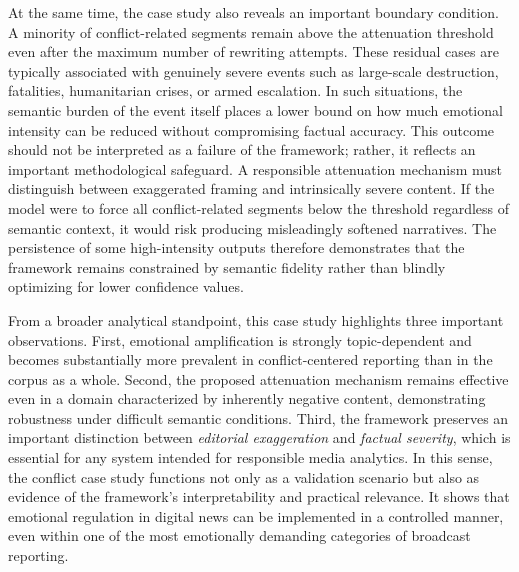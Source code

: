 \documentclass[final,1p,times]{elsarticle}
\begin{document}
At the same time, the case study also reveals an important boundary condition. A minority of conflict-related segments remain above the attenuation threshold even after the maximum number of rewriting attempts. These residual cases are typically associated with genuinely severe events such as large-scale destruction, fatalities, humanitarian crises, or armed escalation. In such situations, the semantic burden of the event itself places a lower bound on how much emotional intensity can be reduced without compromising factual accuracy. This outcome should not be interpreted as a failure of the framework; rather, it reflects an important methodological safeguard. A responsible attenuation mechanism must distinguish between exaggerated framing and intrinsically severe content. If the model were to force all conflict-related segments below the threshold regardless of semantic context, it would risk producing misleadingly softened narratives. The persistence of some high-intensity outputs therefore demonstrates that the framework remains constrained by semantic fidelity rather than blindly optimizing for lower confidence values.

From a broader analytical standpoint, this case study highlights three important observations. First, emotional amplification is strongly topic-dependent and becomes substantially more prevalent in conflict-centered reporting than in the corpus as a whole. Second, the proposed attenuation mechanism remains effective even in a domain characterized by inherently negative content, demonstrating robustness under difficult semantic conditions. Third, the framework preserves an important distinction between \emph{editorial exaggeration} and \emph{factual severity}, which is essential for any system intended for responsible media analytics. In this sense, the conflict case study functions not only as a validation scenario but also as evidence of the framework’s interpretability and practical relevance. It shows that emotional regulation in digital news can be implemented in a controlled manner, even within one of the most emotionally demanding categories of broadcast reporting.
\end{document}
